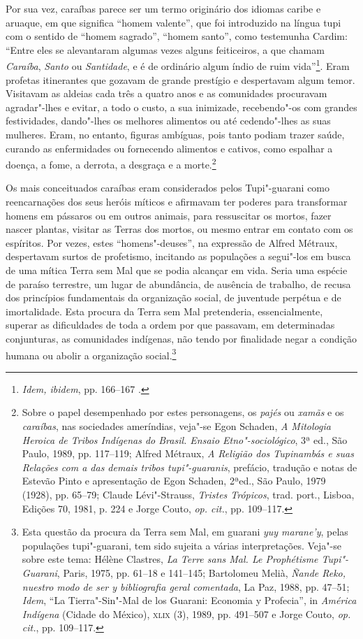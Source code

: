 Por sua vez, caraíbas parece ser um termo originário dos
idiomas caribe e aruaque, em que significa ``homem valente'', que foi
introduzido na língua tupi com o sentido de ``homem sagrado'', ``homem
santo'', como testemunha Cardim: ``Entre eles se
alevantaram algumas vezes alguns feiticeiros, a que chamam \textit{Caraíba},
\textit{Santo} ou \textit{Santidade}, e é de ordinário algum índio de ruim 
vida''\footnote{ \textit{Idem, ibidem}, pp. 166--167 .}. Eram profetas
itinerantes que gozavam de grande prestígio e despertavam algum temor.
Visitavam as aldeias cada três a quatro anos e as comunidades
procuravam agradar"-lhes e evitar, a todo o custo, a sua inimizade,
recebendo"-os com grandes festividades, dando"-lhes os melhores alimentos
ou até cedendo"-lhes as suas mulheres. Eram, no entanto, figuras
ambíguas, pois tanto podiam trazer saúde, curando as enfermidades ou
fornecendo alimentos e cativos, como espalhar a doença, a fome, a
derrota, a desgraça e a morte.\footnote{ Sobre o papel
desempenhado por estes personagens, os \textit{pajés} ou \textit{xamãs}
e os \textit{caraíbas}, nas sociedades ameríndias, veja"-se Egon
Schaden, \textit{A Mitologia Heroica de Tribos Indígenas do Brasil.
Ensaio Etno"-sociológico}, 3ª ed., São Paulo, 1989, pp. 117--119; Alfred
Métraux, \textit{A Religião dos Tupinambás e suas Relações com a das
demais tribos tupi"-guaranis}, prefácio, tradução e notas de Estevão
Pinto e apresentação de Egon Schaden, 2ªed., São Paulo, 1979 (1928),
pp. 65--79; Claude Lévi"-Strauss, \textit{Tristes Trópicos}, trad. port.,
Lisboa, Edições 70, 1981, p. 224 e Jorge Couto, \textit{op. cit.}, pp. 109--117.} 

 Os mais conceituados caraíbas eram considerados pelos
Tupi"-guarani como reencarnações dos seus heróis míticos e afirmavam
ter poderes para transformar homens em pássaros ou em outros animais,
para ressuscitar os mortos, fazer nascer plantas, visitar as Terras
dos mortos, ou mesmo entrar em contato com os espíritos. Por vezes,
estes ``homens"-deuses'', na expressão de Alfred Métraux, despertavam
surtos de profetismo, incitando as populações a segui"-los em busca de
uma mítica Terra sem Mal que se podia alcançar em vida. Seria uma
espécie de paraíso terrestre, um lugar de abundância, de ausência de
trabalho, de recusa dos princípios fundamentais da organização social,
de juventude perpétua e de imortalidade. Esta procura da Terra sem Mal
pretenderia, essencialmente, superar as dificuldades de toda a ordem
por que passavam, em determinadas conjunturas, as comunidades indígenas,
não tendo por finalidade negar a condição humana ou abolir a
organização social.\footnote{ Esta questão da procura da Terra sem
Mal, em guarani \textit{yuy marane'y}, pelas populações tupi"-guarani, 
tem sido sujeita a várias interpretações. Veja"-se sobre este tema:
Hélène Clastres, \textit{La Terre sans Mal. Le Prophétisme
Tupi"-Guarani}, Paris, 1975, pp. 61--18 e 141--145; Bartolomeu Melià,
\textit{Ñande Reko, nuestro modo de ser y bibliografia geral comentada}, 
La Paz, 1988, pp. 47--51; \textit{Idem}, ``La Tierra"-Sin"-Mal de los Guarani:
Economia y Profecia'', in \textit{América Indígena} (Cidade do México),
\textsc{xlix} (3), 1989, pp. 491--507 e Jorge Couto, \textit{op. cit.}, pp. 109--117.} 

